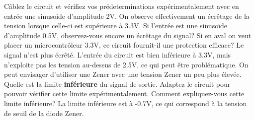 \documentclass{../template/labo}
\begin{document}
\begin{manip}
\Question
{Câblez le circuit et vérifiez vos prédeterminations expérimentalement avec en entrée une sinusoide d'amplitude 2V. 
}
{On observe effectivement un écrêtage de la tension lorsque celle-ci est supérieure à 3.3V. }
\label{Q:zener_4}
\Question
{Si l'entrée est une sinusoïde d'amplitude 0.5V, observez-vous encore un écrêtage du signal? Si en aval on veut placer un microcontrôleur 3.3V, ce circuit fournit-il une protection efficace? }
{Le signal n'est plus écrêté. L'entrée du circuit est bien inférieure à 3.3V, mais n'exploite pas les tension au-dessus de 2.5V, ce qui peut être problématique. On peut envisager d'utiliser une Zener avec une tension Zener un peu plus élevée.
}
\label{Q:zener_4}
\Question
{Quelle est la limite {\bf inférieure} du signal de sortie. Adaptez le circuit pour pouvoir vérifier cette limite expérimentalement. Comment expliquez-vous cette limite inférieure? }
{La limite inférieure est à -0.7V, ce qui correspond à la tension de seuil de la diode Zener. }
\label{Q:zener_5}

\end{manip}
\end{document}
